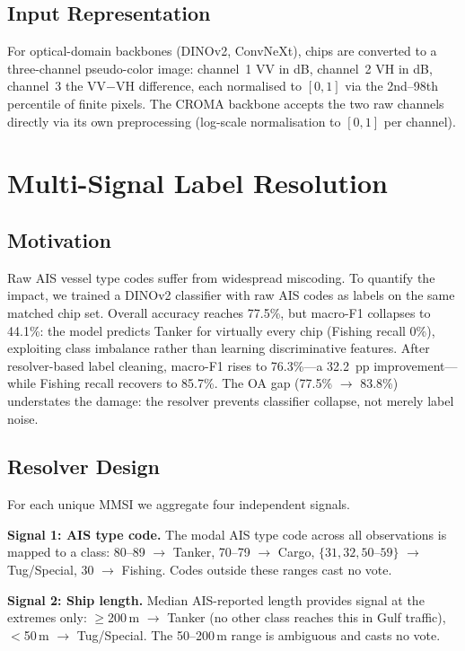 \documentclass[journal]{IEEEtran}
\begin{document}
\subsection{Input Representation}

For optical-domain backbones (DINOv2, ConvNeXt), chips are converted to
a three-channel pseudo-color image: channel~1 VV in dB, channel~2 VH
in dB, channel~3 the VV$-$VH difference, each normalised to $[0,1]$
via the 2nd--98th percentile of finite pixels.
The CROMA backbone accepts the two raw channels directly via its own
preprocessing (log-scale normalisation to $[0,1]$ per channel).

\FloatBarrier
\section{Multi-Signal Label Resolution}
\label{sec:resolver}

\subsection{Motivation}

Raw AIS vessel type codes suffer from widespread miscoding.
To quantify the impact, we trained a DINOv2 classifier with raw AIS
codes as labels on the same matched chip set.
Overall accuracy reaches 77.5\%, but macro-F1 collapses to 44.1\%:
the model predicts Tanker for virtually every chip (Fishing recall 0\%),
exploiting class imbalance rather than learning discriminative features.
After resolver-based label cleaning, macro-F1 rises to 76.3\%---a
32.2~pp improvement---while Fishing recall recovers to 85.7\%.
The OA gap (77.5\% $\to$ 83.8\%) understates the damage: the resolver
prevents classifier collapse, not merely label noise.

\subsection{Resolver Design}

For each unique MMSI we aggregate four independent signals.

\textbf{Signal 1: AIS type code.}
The modal AIS type code across all observations is mapped to a class:
80--89 $\to$ Tanker, 70--79 $\to$ Cargo,
$\{31,32,50\text{--}59\}$ $\to$ Tug/Special, 30 $\to$ Fishing.
Codes outside these ranges cast no vote.

\textbf{Signal 2: Ship length.}
Median AIS-reported length provides signal at the extremes only:
$\geq$200\,m $\to$ Tanker (no other class reaches this in Gulf traffic),
$<$50\,m $\to$ Tug/Special.
The 50--200\,m range is ambiguous and casts no vote.
\end{document}
